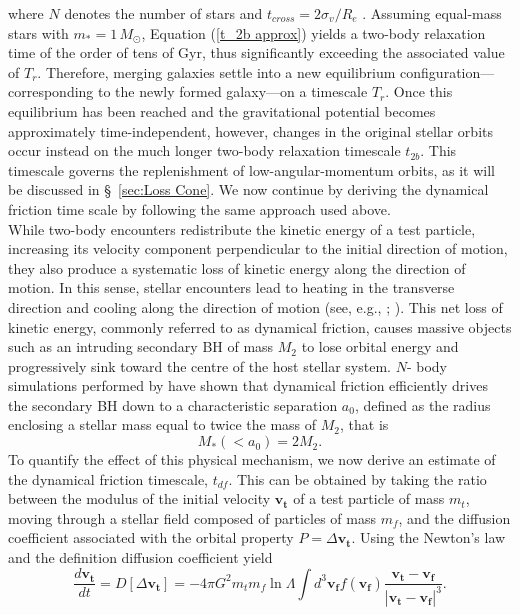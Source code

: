 \documentclass[12pt,twoside,openany]{book}
\begin{document}
where $N$ denotes the number of stars and $t_{cross}=2\sigma_v/R_e$ \parencite{Ciotti_book}. Assuming equal-mass stars with $m_*=1\,M_\odot$, Equation (\ref{t_2b approx}) yields a two-body relaxation time of the order of tens of Gyr, thus significantly exceeding the associated value of $T_r$. Therefore, merging galaxies settle into a new equilibrium configuration—corresponding to the newly formed galaxy—on a timescale $T_r$. Once this equilibrium has been reached and the gravitational potential becomes approximately time-independent, however, changes in the original stellar orbits occur instead on the much longer two-body relaxation timescale $t_{2b}$. This timescale governs the replenishment of low-angular-momentum orbits, as it will be discussed in \S~\ref{sec:Loss Cone}. We now continue by deriving the dynamical friction time scale by following the same approach used above.\\While two-body encounters redistribute the kinetic energy of a test particle, increasing its velocity component perpendicular to the initial direction of motion, they also produce a systematic loss of kinetic energy along the direction of motion. In this sense, stellar encounters lead to heating in the transverse direction and cooling along the direction of motion (see, e.g., \citealt{Chandrasekhar_1943}; \citealt{Binney_book}). This net loss of kinetic energy, commonly referred to as dynamical friction, causes massive objects such as an intruding secondary BH of mass $M_2$ to lose orbital energy and progressively sink toward the centre of the host stellar system. $N$- body simulations performed by \textcite{Baumgardt_2006} have shown that dynamical friction efficiently drives the secondary BH down to a characteristic separation $a_0$, defined as the radius enclosing a stellar mass equal to twice the mass of $M_2$, that is
\begin{equation}
\label{a_0 definition}
M_*(<a_0)=2M_2.
\end{equation}
To quantify the effect of this physical mechanism, we now derive an estimate of the dynamical friction timescale, $t_{df}$. This can be obtained by taking the ratio between the modulus of the initial velocity $\mathbf{v_t}$ of a test particle of mass $m_t$, moving through a stellar field composed of particles of mass $m_f$, and the diffusion coefficient associated with the orbital property $P=\Delta \mathbf{v_t}$. Using the Newton's law and the definition diffusion coefficient yield
\begin{equation}\label{velocity first order diffusion coefficient}
    \frac{d\mathbf{v_t}}{dt}=D[\Delta \mathbf{v_t}]=-4\pi G^2 m_t m_f\ln{\Lambda}\int d^3\mathbf{v_f}f(\mathbf{v_f})\frac{\mathbf{v_t}-\mathbf{v_f}}{|\mathbf{v_t}-\mathbf{v_f}|^3}.
\end{equation}
\end{document}
